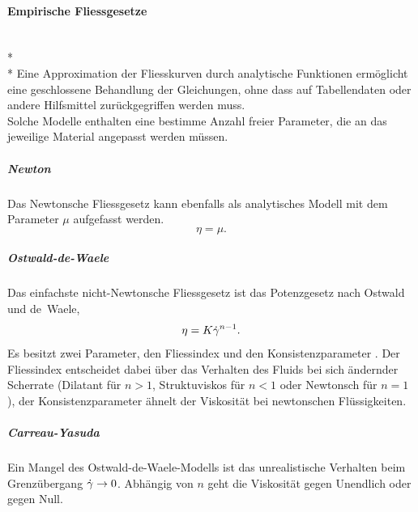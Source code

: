 %
\paragraph{Empirische Fliessgesetze}~\\*~\\*
Eine Approximation der Fliesskurven durch analytische Funktionen ermöglicht eine geschlossene Behandlung der Gleichungen, ohne dass auf Tabellendaten oder andere Hilfsmittel zurückgegriffen werden muss.\\
Solche Modelle enthalten eine bestimme Anzahl freier Parameter, die an das jeweilige Material angepasst werden müssen.
\subparagraph{Newton}
Das Newtonsche Fliessgesetz kann ebenfalls als analytisches Modell mit dem Parameter $\mu$ aufgefasst werden.
\begin{equation}
    \eta = \mu.
    \label{eq:fg:newton}
\end{equation}
\subparagraph{Ostwald-de-Waele}
Das einfachste nicht-Newtonsche Fliessgesetz ist das Potenzgesetz nach Ostwald und de~Waele,
\begin{equation}
    \eta=K\dot\gamma^{n-1}.
    \label{eq:fg:potenz}
\end{equation}
Es besitzt zwei Parameter, den Fliessindex  und den Konsistenzparameter . Der Fliessindex entscheidet dabei über das Verhalten des Fluids bei sich ändernder Scherrate (Dilatant für $n>1$, Struktuviskos für $n<1$ oder Newtonsch für $n=1$), der Konsistenzparameter ähnelt der Viskosität bei newtonschen Flüssigkeiten.
%
\subparagraph{Carreau-Yasuda}
Ein Mangel des Ostwald-de-Waele-Modells ist das unrealistische Verhalten beim Grenzübergang $\dot\gamma\rightarrow 0$. Abhängig von $n$ geht die Viskosität gegen Unendlich oder gegen Null.
